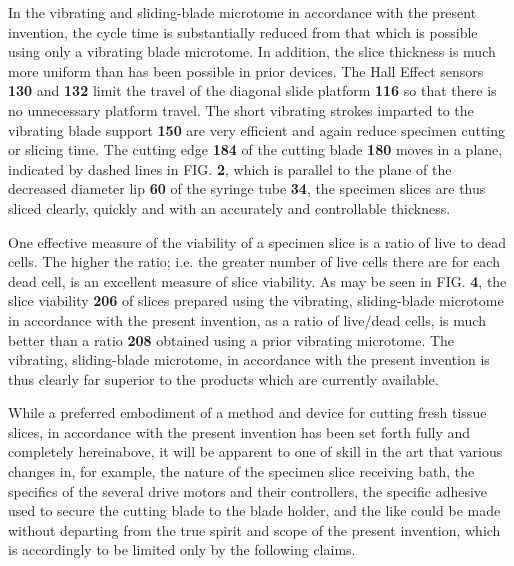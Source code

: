 \documentclass{article}
\begin{document}
In the vibrating and sliding-blade microtome in accordance with the present invention, the cycle time is substantially reduced from that which is possible using only a vibrating blade microtome. In addition, the slice thickness is much more uniform than has been possible in prior devices. The Hall Effect sensors \textbf{130} and \textbf{132} limit the travel of the diagonal slide platform \textbf{116} so that there is no unnecessary platform travel. The short vibrating strokes imparted to the vibrating blade support \textbf{150} are very efficient and again reduce specimen cutting or slicing time. The cutting edge \textbf{184} of the cutting blade \textbf{180} moves in a plane, indicated by dashed lines in FIG. \textbf{2}, which is parallel to the plane of the decreased diameter lip \textbf{60} of the syringe tube \textbf{34}, the specimen slices are thus sliced clearly, quickly and with an accurately and controllable thickness.

One effective measure of the viability of a specimen slice is a ratio of live to dead cells. The higher the ratio; i.e. the greater number of live cells there are for each dead cell, is an excellent measure of slice viability. As may be seen in FIG. \textbf{4}, the slice viability \textbf{206} of slices prepared using the vibrating, sliding-blade microtome in accordance with the present invention, as a ratio of live/dead cells, is much better than a ratio \textbf{208} obtained using a prior vibrating microtome. The vibrating, sliding-blade microtome, in accordance with the present invention is thus clearly far superior to the products which are currently available.

While a preferred embodiment of a method and device for cutting fresh tissue slices, in accordance with the present invention has been set forth fully and completely hereinabove, it will be apparent to one of skill in the art that various changes in, for example, the nature of the specimen slice receiving bath, the specifics of the several drive motors and their controllers, the specific adhesive used to secure the cutting blade to the blade holder, and the like could be made without departing from the true spirit and scope of the present invention, which is accordingly to be limited only by the following claims.
\end{document}
